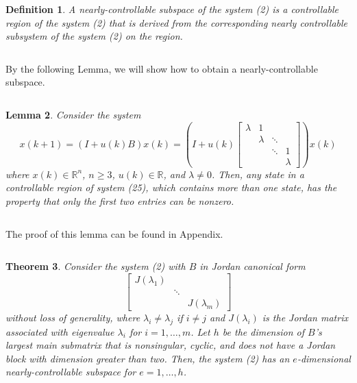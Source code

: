 \documentclass[journal,a4paper,12pt,onecolumn]{IEEEtran}
\newtheorem{theorem}{Theorem}
\newtheorem{definition}[theorem]{Definition}
\newtheorem{lemma}[theorem]{Lemma}
\begin{document}
$\left. {}\right. $

\begin{definition}
A nearly-controllable subspace of the system (2) is a controllable region of
the system (2) that is derived from the corresponding nearly controllable
subsystem of the system (2) on the region.
\end{definition}

$\left. {}\right. $

By the following Lemma, we will show how to obtain a nearly-controllable
subspace.

$\left. {}\right. $

\begin{lemma}
Consider the system\begin{equation}
x\left( k+1\right) =\left( I+u\left( k\right) B\right) x\left( k\right)
=\left( I+u\left( k\right) \left[
\begin{array}{cccc}
\lambda & 1 &  &  \\
& \lambda & \ddots &  \\
&  & \ddots & 1 \\
&  &  & \lambda \end{array}\right] \right) x\left( k\right)
\end{equation}where $x\left( k\right) \in
\mathbb{R}
^{n}$, $n\geq 3$, $u\left( k\right) \in
\mathbb{R}
$, and $\lambda \neq 0$. Then, any state in a controllable region of system
(25), which contains more than one state, has the property that only the
first two entries can be nonzero.
\end{lemma}

$\left. {}\right. $

The proof of this lemma can be found in Appendix.

$\left. {}\right. $

\begin{theorem}
Consider the system (2) with $B$ in Jordan canonical form\begin{equation*}
\left[
\begin{array}{ccc}
J\left( \lambda _{1}\right) &  &  \\
& \ddots &  \\
&  & J\left( \lambda _{m}\right)\end{array}\right]
\end{equation*}without loss of generality, where $\lambda _{i}\neq \lambda _{j}$ if $i\neq
j $ and $J\left( \lambda _{i}\right) $ is the Jordan matrix associated with
eigenvalue $\lambda _{i}$ for $i=1,\ldots ,m$. Let $h$ be the dimension of $B $'s largest main submatrix that is nonsingular, cyclic, and does not have
a Jordan block with dimension greater than two. Then, the system (2) has an $e$-dimensional nearly-controllable subspace for $e=1,\ldots ,h$.
\end{theorem}
\end{document}
